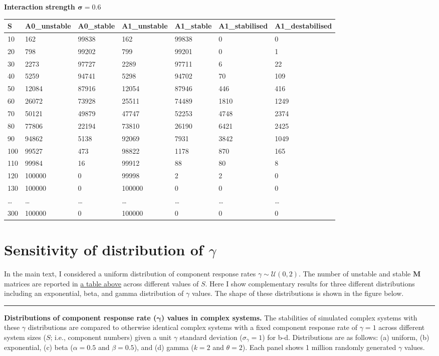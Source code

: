 \documentclass[]{article}
\begin{document}
\textbf{Interaction strength \(\mathbf{\sigma = 0.6}\)}

\begin{longtable}[]{@{}lllllll@{}}
\toprule
S & A0\_unstable & A0\_stable & A1\_unstable & A1\_stable &
A1\_stabilised & A1\_destabilised\tabularnewline
\midrule
\endhead
10 & 162 & 99838 & 162 & 99838 & 0 & 0\tabularnewline
20 & 798 & 99202 & 799 & 99201 & 0 & 1\tabularnewline
30 & 2273 & 97727 & 2289 & 97711 & 6 & 22\tabularnewline
40 & 5259 & 94741 & 5298 & 94702 & 70 & 109\tabularnewline
50 & 12084 & 87916 & 12054 & 87946 & 446 & 416\tabularnewline
60 & 26072 & 73928 & 25511 & 74489 & 1810 & 1249\tabularnewline
70 & 50121 & 49879 & 47747 & 52253 & 4748 & 2374\tabularnewline
80 & 77806 & 22194 & 73810 & 26190 & 6421 & 2425\tabularnewline
90 & 94862 & 5138 & 92069 & 7931 & 3842 & 1049\tabularnewline
100 & 99527 & 473 & 98822 & 1178 & 870 & 165\tabularnewline
110 & 99984 & 16 & 99912 & 88 & 80 & 8\tabularnewline
120 & 100000 & 0 & 99998 & 2 & 2 & 0\tabularnewline
130 & 100000 & 0 & 100000 & 0 & 0 & 0\tabularnewline
\ldots{} & \ldots{} & \ldots{} & \ldots{} & \ldots{} & \ldots{} &
\ldots{}\tabularnewline
300 & 100000 & 0 & 100000 & 0 & 0 & 0\tabularnewline
\bottomrule
\end{longtable}

\hypertarget{gam_dist}{%
\section{\texorpdfstring{Sensitivity of distribution of
\(\gamma\)}{Sensitivity of distribution of \textbackslash{}gamma}}\label{gam_dist}}

In the main text, I considered a uniform distribution of component
response rates \(\gamma \sim \mathcal{U}(0, 2)\). The number of unstable
and stable \(\mathbf{M}\) matrices are reported in
\protect\hyperlink{IncrS}{a table above} across different values of
\(S\). Here I show complementary results for three different
distributions including an exponential, beta, and gamma distribution of
\(\gamma\) values. The shape of these distributions is shown in the
figure below.

\begin{center}\rule{0.5\linewidth}{\linethickness}\end{center}

\textbf{Distributions of component response rate
(\(\boldsymbol{\gamma}\)) values in complex systems.} The stabilities of
simulated complex systems with these \(\gamma\) distributions are
compared to otherwise identical complex systems with a fixed component
response rate of \(\gamma = 1\) across different system sizes (\(S\);
i.e., component numbers) given a unit \(\gamma\) standard deviation
(\(\sigma_{\gamma} = 1\)) for b-d. Distributions are as follows: (a)
uniform, (b) exponential, (c) beta (\(\alpha = 0.5\) and
\(\beta = 0.5\)), and (d) gamma (\(k = 2\) and \(\theta = 2\)). Each
panel shows 1 million randomly generated \(\gamma\) values.
\end{document}
